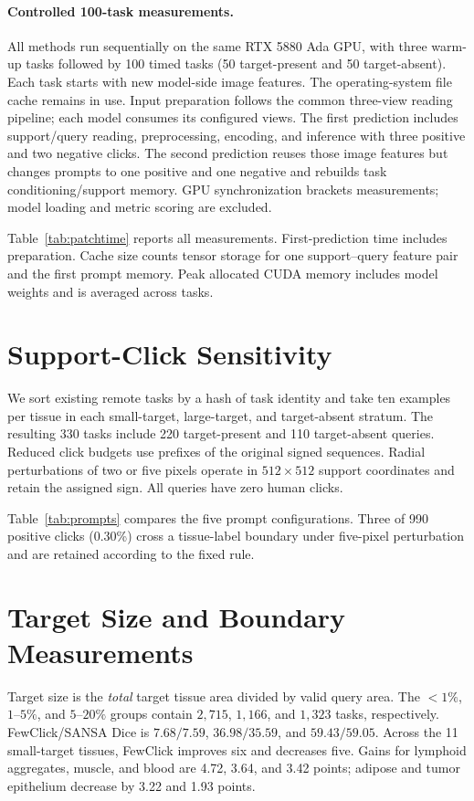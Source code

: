 
\paragraph{Controlled 100-task measurements.}
All methods run sequentially on the same RTX 5880 Ada GPU, with three warm-up tasks followed by 100 timed tasks (50 target-present and 50 target-absent). Each task starts with new model-side image features. The operating-system file cache remains in use. Input preparation follows the common three-view reading pipeline; each model consumes its configured views. The first prediction includes support/query reading, preprocessing, encoding, and inference with three positive and two negative clicks. The second prediction reuses those image features but changes prompts to one positive and one negative and rebuilds task conditioning/support memory. GPU synchronization brackets measurements; model loading and metric scoring are excluded.

Table~\ref{tab:patchtime} reports all measurements. First-prediction time includes preparation. Cache size counts tensor storage for one support--query feature pair and the first prompt memory. Peak allocated CUDA memory includes model weights and is averaged across tasks.

\section{Support-Click Sensitivity}

We sort existing remote tasks by a hash of task identity and take ten examples per tissue in each small-target, large-target, and target-absent stratum. The resulting 330 tasks include 220 target-present and 110 target-absent queries. Reduced click budgets use prefixes of the original signed sequences. Radial perturbations of two or five pixels operate in $512\times512$ support coordinates and retain the assigned sign. All queries have zero human clicks.

Table~\ref{tab:prompts} compares the five prompt configurations. Three of 990 positive clicks (0.30\%) cross a tissue-label boundary under five-pixel perturbation and are retained according to the fixed rule.

\section{Target Size and Boundary Measurements}

Target size is the \emph{total} target tissue area divided by valid query area. The $<1\%$, $1$--$5\%$, and $5$--$20\%$ groups contain $2{,}715$, $1{,}166$, and $1{,}323$ tasks, respectively. FewClick/SANSA Dice is $7.68/7.59$, $36.98/35.59$, and $59.43/59.05$. Across the 11 small-target tissues, FewClick improves six and decreases five. Gains for lymphoid aggregates, muscle, and blood are 4.72, 3.64, and 3.42 points; adipose and tumor epithelium decrease by 3.22 and 1.93 points.

